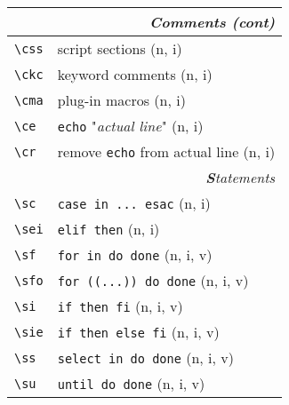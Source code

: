 \documentclass[oneside,11pt,landscape,DIV16]{scrartcl}
\begin{document}
\begin{multicols}{3}
\begin{center}
%
\begin{tabular}[]{|p{11mm}|p{60mm}|}
\hline
	\multicolumn{2}{|r|}{\textsl{\textbf{C}omments (cont)}}                       \\[1.0ex]
\hline     \verb'\css'  & script sections                   \hfill (n, i)\\
\hline     \verb'\ckc'  & keyword comments                  \hfill (n, i)\\
\hline     \verb'\cma'  & plug-in macros                    \hfill (n, i)\\
%
\hline     \verb'\ce'   & \texttt{echo} "\textsl{actual line}"  \hfill (n, i)\\
\hline     \verb'\cr'   & remove \texttt{echo} from actual line \hfill (n, i)\\
\hline
\hline
\multicolumn{2}{|r|}{\textsl{\textbf{S}tatements}}                    \\[1.0ex]
\hline \verb'\sc'  & \verb'case in ... esac'               \hfill (n, i)\\
\hline \verb'\sei' & \verb'elif then'                      \hfill (n, i)\\
\hline \verb'\sf'  & \verb'for in do done'                 \hfill (n, i, v)\\
\hline \verb'\sfo' & \verb'for ((...)) do done'            \hfill (n, i, v)\\
\hline \verb'\si'  & \verb'if then fi'                     \hfill (n, i, v)\\
\hline \verb'\sie' & \verb'if then else fi'                \hfill (n, i, v)\\
\hline \verb'\ss'  & \verb'select in do done'              \hfill (n, i, v)\\
\hline \verb'\su'  & \verb'until do done'                  \hfill (n, i, v)\\

\end{tabular}
\end{center}
\end{multicols}
\end{document}
